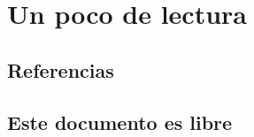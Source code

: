 

\appendix

\section{Un poco de lectura}

%
\subsection{Referencias}

  \begin{frame}{\insertsubsection}
    {}
    
    \nocite{peters2004zenofpython}
    \nocite{ries2011lean}
  \end{frame}

%
\subsection{Este documento es libre}



